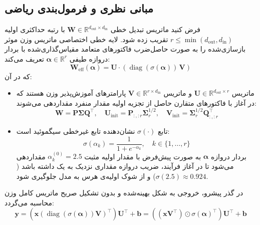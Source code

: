 \subsection{مبانی نظری و فرمول‌بندی ریاضی}
فرض کنید ماتریس تبدیل خطی $\mathbf{W} \in \mathbb{R}^{d_{\text{out}} \times d_{\text{in}}}$ با رتبه حداکثری اولیه $r \le \min(d_{\text{out}}, d_{\text{in}})$ تقریب زده شود. لایه خطی اختصاصی  ماتریس وزن موثر بازسازی‌شده را به صورت حاصل‌ضرب فاکتورهای متعامد مقیاس‌گذاری‌شده با بردار دروازه طیفی $\boldsymbol{\alpha} \in \mathbb{R}^r$ تعریف می‌کند:
\begin{equation}
\mathbf{W}_{\text{eff}}(\boldsymbol{\alpha}) = \mathbf{U} \cdot \left( \operatorname{diag}(\sigma(\boldsymbol{\alpha})) \, \mathbf{V} \right)
\end{equation}
که در آن:
\begin{itemize}
    \item ماتریس $\mathbf{U} \in \mathbb{R}^{d_{\text{out}} \times r}$ و ماتریس $\mathbf{V} \in \mathbb{R}^{r \times d_{\text{in}}}$ پارامترهای آموزش‌پذیر وزن هستند که در آغاز با فاکتورهای متقارن حاصل از تجزیه اولیه مقدار منفرد مقداردهی می‌شوند:
    \begin{equation}
    \mathbf{W} = \mathbf{P} \mathbf{\Sigma} \mathbf{Q}^\top, \quad \mathbf{U}_{\text{init}} = \mathbf{P}_{:, :r} \mathbf{\Sigma}_r^{1/2}, \quad \mathbf{V}_{\text{init}} = \mathbf{\Sigma}_r^{1/2} \mathbf{Q}_{:, :r}^\top
    \end{equation}
    \item تابع $\sigma(\cdot)$ نشان‌دهنده تابع غیرخطی سیگموئید است:
    \begin{equation}
    \sigma(\alpha_k) = \frac{1}{1 + e^{-\alpha_k}}, \quad k \in \{1, \dots, r\}
    \end{equation}
    بردار دروازه $\boldsymbol{\alpha}$ به صورت پیش‌فرض با مقدار اولیه مثبت $\alpha_k^{(0)} = 2.5$ مقداردهی می‌شود تا در آغاز فرآیند، ضریب دروازه مقداری نزدیک به یک داشته باشد ($\sigma(2.5) \approx 0.924$) و از شوک اولیه‌ی هرس به مدل جلوگیری شود.
\end{itemize}

در گذر پیشرو، خروجی به شکل بهینه‌شده و بدون تشکیل صریح ماتریس کامل وزن محاسبه می‌گردد:
\begin{equation}
\mathbf{y} = \left( \mathbf{x} \left( \operatorname{diag}(\sigma(\boldsymbol{\alpha})) \mathbf{V} \right)^\top \right) \mathbf{U}^\top + \mathbf{b} = \left( (\mathbf{x} \mathbf{V}^\top) \odot \sigma(\boldsymbol{\alpha})^\top \right) \mathbf{U}^\top + \mathbf{b}
\end{equation}

